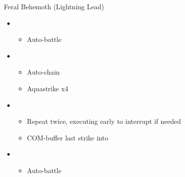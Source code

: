 \documentclass{report}
\begin{document}
\begin{battle}{Feral Behemoth (Lightning Lead)}
\begin{itemize}
    \item \first
    \begin{itemize}
        \item Auto-battle
    \end{itemize}
    \item \fourth
    \begin{itemize}
        \item Auto-chain
        \item Aquastrike x4
    \end{itemize}
    \item \fifth
    \begin{itemize}
        \item Repeat twice, executing early to interrupt if needed
        \item COM-buffer last strike into
    \end{itemize}
    \item \first
    \begin{itemize}
        \item Auto-battle
    \end{itemize}
\end{itemize}
\end{battle}

 
\end{document}
